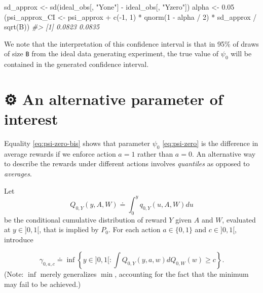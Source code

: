 \documentclass[
  11pt,
  openright,twoside]{book}
\newenvironment{Shaded}{\begin{snugshade}}{\end{snugshade}}
\newcommand{\CommentTok}[1]{\textcolor[rgb]{0.56,0.35,0.01}{\textit{#1}}}
\newcommand{\DecValTok}[1]{\textcolor[rgb]{0.00,0.00,0.81}{#1}}
\newcommand{\FloatTok}[1]{\textcolor[rgb]{0.00,0.00,0.81}{#1}}
\newcommand{\FunctionTok}[1]{\textcolor[rgb]{0.00,0.00,0.00}{#1}}
\newcommand{\NormalTok}[1]{#1}
\newcommand{\OtherTok}[1]{\textcolor[rgb]{0.56,0.35,0.01}{#1}}
\newcommand{\SpecialCharTok}[1]{\textcolor[rgb]{0.00,0.00,0.00}{#1}}
\newcommand{\StringTok}[1]{\textcolor[rgb]{0.31,0.60,0.02}{#1}}
\newcommand{\gear}{\usebox{\gearbox}\;}
\newcommand{\defq}{\doteq}
\theoremstyle{definition}
\theoremstyle{definition}
\theoremstyle{definition}
\theoremstyle{definition}
\theoremstyle{remark}
\begin{document}
\begin{Shaded}
\begin{Highlighting}[]
\NormalTok{sd\_approx }\OtherTok{\textless{}{-}} \FunctionTok{sd}\NormalTok{(ideal\_obs[, }\StringTok{"Yone"}\NormalTok{] }\SpecialCharTok{{-}}\NormalTok{ ideal\_obs[, }\StringTok{"Yzero"}\NormalTok{])}
\NormalTok{alpha }\OtherTok{\textless{}{-}} \FloatTok{0.05}
\NormalTok{(psi\_approx\_CI }\OtherTok{\textless{}{-}}\NormalTok{ psi\_approx }\SpecialCharTok{+} \FunctionTok{c}\NormalTok{(}\SpecialCharTok{{-}}\DecValTok{1}\NormalTok{, }\DecValTok{1}\NormalTok{) }\SpecialCharTok{*}
   \FunctionTok{qnorm}\NormalTok{(}\DecValTok{1} \SpecialCharTok{{-}}\NormalTok{ alpha }\SpecialCharTok{/} \DecValTok{2}\NormalTok{) }\SpecialCharTok{*}\NormalTok{ sd\_approx }\SpecialCharTok{/} \FunctionTok{sqrt}\NormalTok{(B))}
\CommentTok{\#\textgreater{} [1] 0.0823 0.0835}
\end{Highlighting}
\end{Shaded}

We note that the interpretation of this confidence interval is that in 95\% of
draws of size \texttt{B} from the ideal data generating experiment, the true value of
\(\psi_0\) will be contained in the generated confidence interval.

\hypertarget{exo-alternative-parameter-first-pass}{%
\section{\texorpdfstring{⚙ \gear An alternative parameter of interest}{⚙ An alternative parameter of interest}}\label{exo-alternative-parameter-first-pass}}

Equality \eqref{eq:psi-zero-bis} shows that parameter \(\psi_0\)
\eqref{eq:psi-zero} is the difference in average rewards if we enforce action
\(a = 1\) rather than \(a = 0\). An alternative way to describe the rewards under
different actions involves \emph{quantiles} as opposed to \emph{averages}.

Let \begin{equation*} Q_{0,Y}(y,  A, W) \defq \int_{0}^y q_{0,Y}(u,  A, W) du
\end{equation*} be the conditional cumulative distribution of reward \(Y\) given
\(A\) and \(W\), evaluated at \(y \in ]0,1[\), that is implied by \(P_0\). For each
action \(a \in \{0,1\}\) and \(c \in ]0,1[\), introduce

\begin{equation}
\gamma_{0,a,c}  \defq  \inf  \left\{y  \in  ]0,1[ :  \int  Q_{0,Y}(y,  a,  w)
dQ_{0,W}(w) \ge c \right\}. \label{eq:def-quantile}
\end{equation}
(Note: \(\inf\) merely generalizes \(\min\), accounting for the fact that the
minimum may fail to be achieved.)
\end{document}

